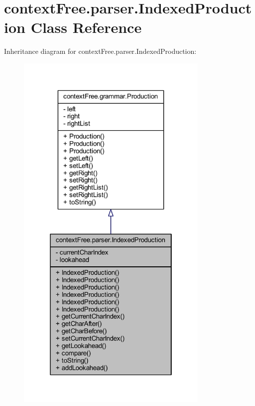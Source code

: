 \hypertarget{classcontext_free_1_1parser_1_1_indexed_production}{\section{context\-Free.\-parser.\-Indexed\-Production Class Reference}
\label{classcontext_free_1_1parser_1_1_indexed_production}
}


Inheritance diagram for context\-Free.\-parser.\-Indexed\-Production\-:
\nopagebreak
\begin{figure}[H]
\begin{center}
\leavevmode
\includegraphics[width=262pt]{classcontext_free_1_1parser_1_1_indexed_production__inherit__graph}
\end{center}
\end{figure}



